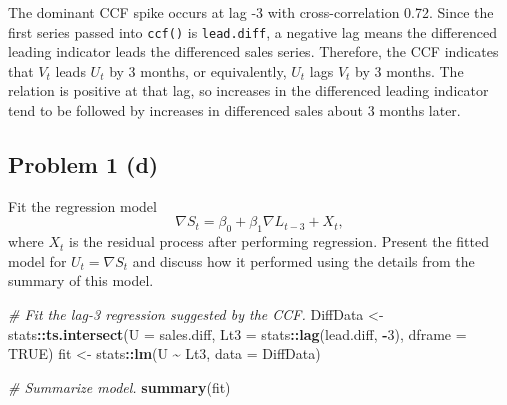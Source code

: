 \documentclass[
  10pt,
]{extarticle}
\newenvironment{Shaded}{\begin{snugshade}}{\end{snugshade}}
\newcommand{\AttributeTok}[1]{\textcolor[rgb]{0.13,0.29,0.53}{#1}}
\newcommand{\CommentTok}[1]{\textcolor[rgb]{0.56,0.35,0.01}{\textit{#1}}}
\newcommand{\ConstantTok}[1]{\textcolor[rgb]{0.56,0.35,0.01}{#1}}
\newcommand{\DecValTok}[1]{\textcolor[rgb]{0.00,0.00,0.81}{#1}}
\newcommand{\FunctionTok}[1]{\textcolor[rgb]{0.13,0.29,0.53}{\textbf{#1}}}
\newcommand{\NormalTok}[1]{#1}
\newcommand{\OtherTok}[1]{\textcolor[rgb]{0.56,0.35,0.01}{#1}}
\newcommand{\SpecialCharTok}[1]{\textcolor[rgb]{0.81,0.36,0.00}{\textbf{#1}}}
\begin{document}
\begin{Shaded}
\end{Shaded}

The dominant CCF spike occurs at lag -3 with cross-correlation 0.72. Since the first series passed into \texttt{ccf()} is \texttt{lead.diff}, a negative lag means the differenced leading indicator leads the differenced sales series. Therefore, the CCF indicates that \(V_t\) leads \(U_t\) by 3 months, or equivalently, \(U_t\) lags \(V_t\) by 3 months. The relation is positive at that lag, so increases in the differenced leading indicator tend to be followed by increases in differenced sales about 3 months later.

\newpage

\subsection{Problem 1 (d)}\label{problem-1-d}

\begin{problem}[Problem 1 (d)]
Fit the regression model
\[
\nabla S_t = \beta_0 + \beta_1 \nabla L_{t-3} + X_t,
\]
where \(X_t\) is the residual process after performing regression. Present the fitted model for \(U_t = \nabla S_t\) and discuss how it performed using the details from the summary of this model.
\end{problem}

\begin{Shaded}
\begin{Highlighting}[]
\CommentTok{\# Fit the lag{-}3 regression suggested by the CCF.}
\NormalTok{DiffData }\OtherTok{\textless{}{-}}\NormalTok{ stats}\SpecialCharTok{::}\FunctionTok{ts.intersect}\NormalTok{(}\AttributeTok{U =}\NormalTok{ sales.diff, }\AttributeTok{Lt3 =}\NormalTok{ stats}\SpecialCharTok{::}\FunctionTok{lag}\NormalTok{(lead.diff, }\SpecialCharTok{{-}}\DecValTok{3}\NormalTok{), }\AttributeTok{dframe =} \ConstantTok{TRUE}\NormalTok{)}
\NormalTok{fit }\OtherTok{\textless{}{-}}\NormalTok{ stats}\SpecialCharTok{::}\FunctionTok{lm}\NormalTok{(U }\SpecialCharTok{\textasciitilde{}}\NormalTok{ Lt3, }\AttributeTok{data =}\NormalTok{ DiffData)}

\CommentTok{\# Summarize model.}
\FunctionTok{summary}\NormalTok{(fit)}
\end{Highlighting}
\end{Shaded}
\end{document}
